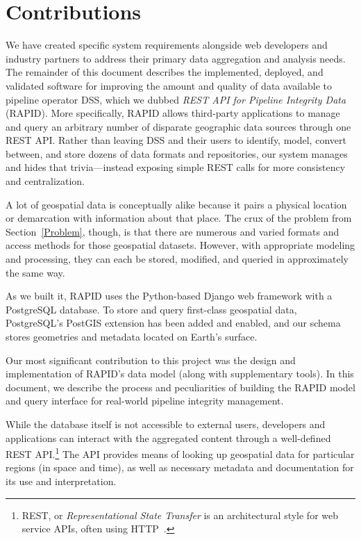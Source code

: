 \section{Contributions}
We have created specific system requirements alongside web developers and industry partners to address their primary data aggregation and analysis needs. The remainder of this document describes the implemented, deployed, and validated software for improving the amount and quality of data available to pipeline operator DSS, which we dubbed \textit{REST API for Pipeline Integrity Data} (RAPID). More specifically, RAPID allows third-party applications to manage and query an arbitrary number of disparate geographic data sources through one REST API. Rather than leaving DSS and their users to identify, model, convert between, and store dozens of data formats and repositories, our system manages and hides that trivia---instead exposing simple REST calls for more consistency and centralization.

A lot of geospatial data is conceptually alike because it pairs a physical location or demarcation with information about that place. The crux of the problem from Section~\ref{Problem}, though, is that there are numerous and varied formats and access methods for those geospatial datasets. However, with appropriate modeling and processing, they can each be stored, modified, and queried in approximately the same way.

As we built it, RAPID uses the Python-based Django web framework with a PostgreSQL database. To store and query first-class geospatial data, PostgreSQL's PostGIS extension has been added and enabled, and our schema stores geometries and metadata located on Earth's surface.

Our most significant contribution to this project was the design and implementation of RAPID's data model (along with supplementary tools). In this document, we describe the process and peculiarities of building the RAPID model and query interface for real-world pipeline integrity management.

While the database itself is not accessible to external users, developers and applications can interact with the aggregated content through a well-defined REST API.\footnote{REST, or \textit{Representational State Transfer} is an architectural style for web service APIs, often using HTTP~\cite{Francis}.} The API provides means of looking up geospatial data for particular regions (in space and time), as well as necessary metadata and documentation for its use and interpretation.

